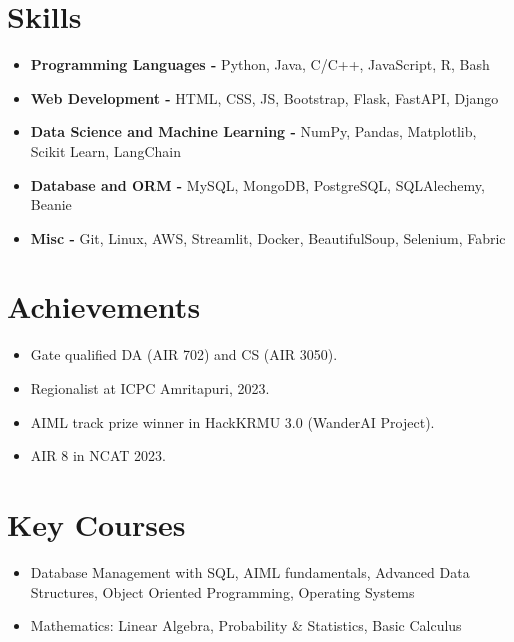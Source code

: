 \documentclass[a4paper,11pt]{article}
\begin{document}
\section*{Skills}
\vspace{-2mm}
\begin{itemize}[label=\textbullet, left=0pt]
    \item \textbf{Programming Languages -} \small Python, Java, C/C++, JavaScript, R, Bash
    \vspace{-2mm}
    \item \textbf{Web Development -} \small HTML, CSS, JS, Bootstrap, Flask, FastAPI, Django
    \vspace{-2mm}
    \item \textbf{Data Science and Machine Learning -} \small NumPy, Pandas, Matplotlib, Scikit Learn, LangChain
    \vspace{-2mm}
    \item \textbf{Database and ORM -} \small MySQL, MongoDB, PostgreSQL, SQLAlechemy, Beanie
    \vspace{-2mm}
    \item \textbf{Misc -} \small Git, Linux, AWS, Streamlit, Docker, BeautifulSoup, Selenium, Fabric
    \vspace{-2mm}
\end{itemize}
\vspace{-5mm}

\section*{Achievements}
\vspace{-2mm}
\begin{itemize}[label=\textbullet, left=0pt, itemsep=0pt,parsep=0pt,topsep=0pt,partopsep=0pt]
    \item Gate qualified DA (AIR 702) and CS (AIR 3050).
    \item Regionalist at ICPC Amritapuri, 2023.
    \item AIML track prize winner in HackKRMU 3.0 (WanderAI Project).
    \item AIR 8 in NCAT 2023.
\end{itemize}
\vspace{-5mm}

\section*{Key Courses}
\vspace{-2mm}
\begin{itemize}[label=\textbullet, left=0pt, itemsep=0pt,parsep=0pt,topsep=0pt,partopsep=0pt]
    \item Database Management with SQL, AIML fundamentals, Advanced Data Structures, Object Oriented Programming, Operating Systems
    \item Mathematics: Linear Algebra, Probability \& Statistics, Basic Calculus
\end{itemize}
\vspace{-3mm}
\end{document}
